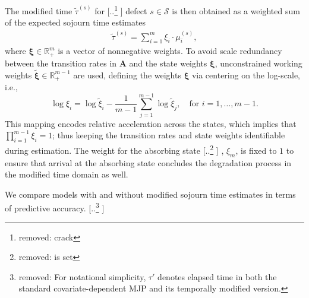 \documentclass{article}
\providecommand{\DIFadd}[1]{{\protect\color{blue} \sf #1}} %
\providecommand{\DIFdel}[1]{{\protect\color{red} [..\footnote{removed: #1} ]}} %
\providecommand{\DIFaddbegin}{} %
\providecommand{\DIFaddend}{} %
\providecommand{\DIFdelbegin}{} %
\providecommand{\DIFdelend}{} %
\begin{document}
\DIFaddend The modified time $\widetilde{\tau}^{(s)}$ for \DIFdelbegin \DIFdel{crack }\DIFdelend \DIFaddbegin \DIFadd{defect }\DIFaddend $s \in \mathcal S$ is then obtained as a weighted sum of the expected sojourn time estimates
\begin{align}
\widetilde\tau^{(s)}= \sum_{i = 1}^m \xi_i  \cdot \mu_i^{(s)}, \label{eq:warped_time}
\end{align}
where $\bm{\xi} \in \mathbb{R}_+^m$ is a vector of nonnegative weights. 
\DIFaddbegin \DIFadd{To avoid scale redundancy between the transition rates in $\bm A$ and the state weights $\bm\xi$, unconstrained working weights $\widetilde{\bm\xi}\in\mathbb{R}_+^{m-1}$ are used, defining the weights $\bm\xi$ via centering on the log-scale, i.e.,
}$$
 \log \xi_i = \log\widetilde{\xi}_i - \frac{1}{m-1}\sum_{j=1}^{m-1}\log\widetilde{\xi}_j, \quad \text{for } i = 1, \dots, m-1.
$$
\DIFadd{This mapping encodes relative acceleration across the states, which implies that $\prod_{i = 1}^{m-1} \xi_i = 1$; thus keeping the transition rates and state weights identifiable during estimation.
}\DIFaddend The weight for the absorbing state\DIFdelbegin \DIFdel{is set }\DIFdelend \DIFaddbegin \DIFadd{, $\xi_m$, is fixed }\DIFaddend to $1$ to ensure that arrival at the absorbing state concludes the degradation process in the modified time domain as well.
\DIFaddbegin 

\DIFaddend We compare models with and without modified sojourn time estimates in terms of predictive accuracy. \DIFdelbegin \DIFdel{For notational simplicity, $\tau'$ denotes elapsed time in both the standard covariate-dependent MJP and its temporally modified version.
}\DIFdelend %


\DIFaddbegin 
\end{document}
